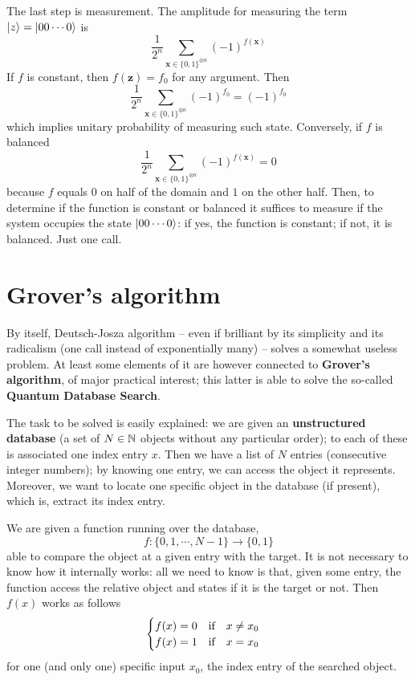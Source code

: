 The last step is measurement. The amplitude for measuring the term $\ket{z} = \ket{00 \cdots 0}$ is
\[
    \frac{1}{2^n} \sum_{\mathbf{x} \in \lbrace 0,1 \rbrace^{\otimes n}} (-1)^{f(\mathbf{x})}
\]
If $f$ is constant, then $f(\mathbf{z}) = f_0$ for any argument. Then
\[
    \frac{1}{2^n} \sum_{\mathbf{x} \in \lbrace 0,1 \rbrace^{\otimes n}} (-1)^{f_0} = (-1)^{f_0}
\]
which implies unitary probability of measuring such state. Conversely, if $f$ is balanced
\[
    \frac{1}{2^n} \sum_{\mathbf{x} \in \lbrace 0,1 \rbrace^{\otimes n}} (-1)^{f(\mathbf{x})} = 0
\]
because $f$ equals $0$ on half of the domain and $1$ on the other half. Then, to determine if the function is constant or balanced it suffices to measure if the system occupies the state $\ket{00\cdots0}$: if yes, the function is constant; if not, it is balanced. Just one call.

\section{Grover's algorithm}\label{sec:grover's algorithm}

By itself, Deutsch-Josza algorithm -- even if brilliant by its simplicity and its radicalism (one call instead of exponentially many) -- solves a somewhat useless problem. At least some elements of it are however connected to \textbf{Grover's algorithm}, of major practical interest; this latter is able to solve the so-called \textbf{Quantum Database Search}.

The task to be solved is easily explained: we are given an \textbf{unstructured database} (a set of $N \in \mathbb{N}$ objects without any particular order); to each of these is associated one index entry $x$. Then we have a list of $N$ entries (consecutive integer numbers); by knowing one entry, we can access the object it represents. Moreover, we want to locate one specific object in the database (if present), which is, extract its index entry.

We are given a function running over the database,
\[
    f \colon \lbrace 0,1,\cdots,N-1 \rbrace \to \lbrace 0,1 \rbrace
\]
able to compare the object at a given entry with the target. It is not necessary to know how it internally works: all we need to know is that, given some entry, the function access the relative object and states if it is the target or not. Then $f(x)$ works as follows
\[
\begin{cases}
    f(x) = 0 \qq{if} x \neq x_0 \\
    f(x) = 1 \qq{if} x = x_0 
\end{cases}
\]
for one (and only one) specific input $x_0$, the index entry of the searched object.

